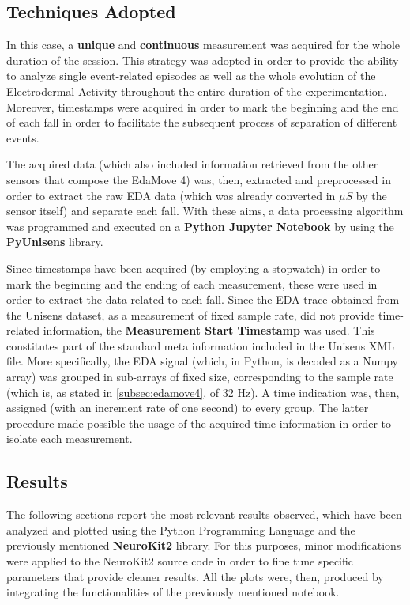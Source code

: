 \subsection{Techniques Adopted}\label{subsec:session-techniques}

In this case, a \textbf{unique} and \textbf{continuous} measurement was acquired for the whole duration of the session. This strategy was adopted in order to provide the ability to analyze single event-related episodes as well as the whole evolution of the Electrodermal Activity throughout the entire duration of the experimentation. Moreover, timestamps were acquired in order to mark the beginning and the end of each fall in order to facilitate the subsequent process of separation of different events.

The acquired data (which also included information retrieved from the other sensors that compose the EdaMove 4) was, then, extracted and preprocessed in order to extract the raw EDA data (which was already converted in $\mu S$ by the sensor itself) and separate each fall. With these aims, a data processing algorithm was programmed and executed on a \textbf{Python Jupyter Notebook} by using the \textbf{PyUnisens} library.

Since timestamps have been acquired (by employing a stopwatch) in order to mark the beginning and the ending of each measurement, these were used in order to extract the data related to each fall. Since the EDA trace obtained from the Unisens dataset, as a measurement of fixed sample rate, did not provide time-related information, the \textbf{Measurement Start Timestamp} was used. This constitutes part of the standard meta information included in the Unisens XML file. More specifically, the EDA signal (which, in Python, is decoded as a Numpy array) was grouped in sub-arrays of fixed size, corresponding to the sample rate (which is, as stated in \ref{subsec:edamove4}, of 32 Hz). A time indication was, then, assigned (with an increment rate of one second) to every group. The latter procedure made possible the usage of the acquired time information in order to isolate each measurement.

\subsection{Results}\label{subsec:results}

The following sections report the most relevant results observed, which have been analyzed and plotted using the Python Programming Language and the previously mentioned \textbf{NeuroKit2} library. For this purposes, minor modifications were applied to the NeuroKit2 source code in order to fine tune specific parameters that provide cleaner results. All the plots were, then, produced by integrating the functionalities of the previously mentioned notebook. 

